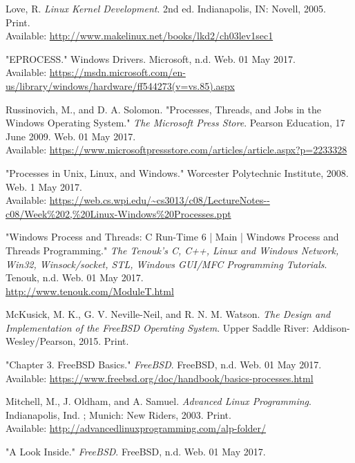 \documentclass[10pt,draftclsnofoot,onecolumn,journal,compsoc]{IEEEtran}
\begin{document}
\begin{thebibliography}{18}

Love, R. \textit{Linux Kernel Development}. 2nd ed. Indianapolis, IN: Novell, 2005. Print. \\
Available: \url{http://www.makelinux.net/books/lkd2/ch03lev1sec1}

"EPROCESS." Windows Drivers. Microsoft, n.d. Web. 01 May 2017. \\
Available: \url{https://msdn.microsoft.com/en-us/library/windows/hardware/ff544273(v=vs.85).aspx}

Russinovich, M., and D. A. Solomon. "Processes, Threads, and Jobs in the Windows Operating System." \textit{The Microsoft Press Store}. Pearson Education, 17 June 2009. Web. 01 May 2017. \\
Available: \url{https://www.microsoftpressstore.com/articles/article.aspx?p=2233328}

"Processes in Unix, Linux, and Windows." Worcester Polytechnic Institute, 2008. Web. 1 May 2017. \\
Available: \url{https://web.cs.wpi.edu/~cs3013/c08/LectureNotes--c08/Week\%202,\%20Linux-Windows\%20Processes.ppt}

"Windows Process and Threads: C Run-Time 6 | Main | Windows Process and Threads Programming." \textit{The Tenouk's C, C++, Linux and Windows Network, Win32, Winsock/socket, STL, Windows GUI/MFC Programming Tutorials}. Tenouk, n.d. Web. 01 May 2017. \\
\url{http://www.tenouk.com/ModuleT.html}

McKusick, M. K., G. V. Neville-Neil, and R. N. M. Watson. \textit{The Design and Implementation of the FreeBSD Operating System}. Upper Saddle River: Addison-Wesley/Pearson, 2015. Print.

"Chapter 3. FreeBSD Basics." \textit{FreeBSD}. FreeBSD, n.d. Web. 01 May 2017. \\
Available: \url{https://www.freebsd.org/doc/handbook/basics-processes.html}

Mitchell, M., J. Oldham, and A. Samuel. \textit{Advanced Linux Programming}. Indianapolis, Ind. ; Munich: New Riders, 2003. Print. \\
Available: \url{http://advancedlinuxprogramming.com/alp-folder/}

"A Look Inside." \textit{FreeBSD}. FreeBSD, n.d. Web. 01 May 2017. \\


\end{thebibliography}
\end{document}
